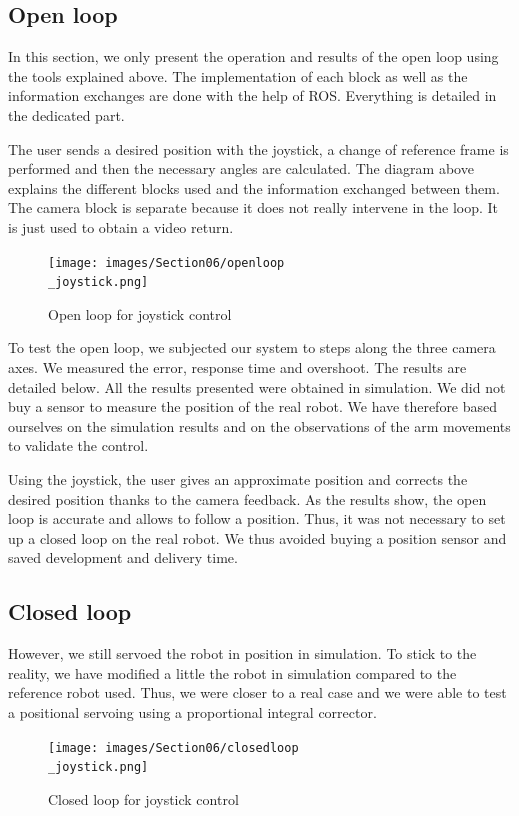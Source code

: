\subsection{Open loop}

In this section, we only present the operation and results of the open loop using the tools explained above. The implementation of each block as well as the information exchanges are done with the help of ROS. Everything is detailed in the dedicated part.

\bigbreak
The user sends a desired position with the joystick, a change of reference frame is performed and then the necessary angles are calculated. The diagram above explains the different blocks used and the information exchanged between them. The camera block is separate because it does not really intervene in the loop. It is just used to obtain a video return.
\begin{figure}[ht]
    \centering
    \texttt{[image: images/Section06/openloop\\\_joystick.png]}
    \caption{Open loop for joystick control}
    \label{fig:mesh19}
\end{figure}
\FloatBarrier

\bigbreak 
To test the open loop, we subjected our system to steps along the three camera axes. We measured the error, response time and overshoot. The results are detailed below. All the results presented were obtained in simulation. We did not buy a sensor to measure the position of the real robot. We have therefore based ourselves on the simulation results and on the observations of the arm movements to validate the control.

\bigbreak
Using the joystick, the user gives an approximate position and corrects the desired position thanks to the camera feedback. As the results show, the open loop is accurate and allows to follow a position. Thus, it was not necessary to set up a closed loop on the real robot. We thus avoided buying a position sensor and saved development and delivery time.

\subsection{Closed loop}


However, we still servoed the robot in position in simulation. To stick to the reality, we have modified a little the robot in simulation compared to the reference robot used. Thus, we were closer to a real case and we were able to test a positional servoing using a proportional integral corrector.

\begin{figure}[ht]
    \centering
    \texttt{[image: images/Section06/closedloop\\\_joystick.png]}
    \caption{Closed loop for joystick control}
    \label{fig:mesh20}
\end{figure}
\FloatBarrier